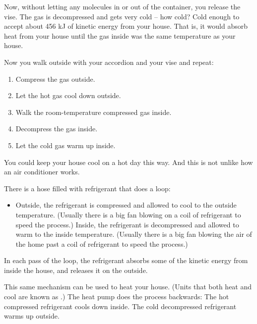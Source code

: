 Now,  without letting any molecules in or out of the container,  you release the vise.  The gas is decompressed and gets very cold -- how cold?  Cold enough to accept about 456 kJ of kinetic energy from your house.  That is,  it would absorb heat from your house until the gas inside was the same temperature as your house.

Now you walk outside with your accordion and your vise and repeat:
\begin{enumerate}
\item Compress the gas outside.
\item Let the hot gas cool down outside.
\item Walk the room-temperature compressed gas inside.
\item Decompress the gas inside.
\item Let the cold gas warm up inside.
\end{enumerate}

You could keep your house cool on a hot day this way.  And this is not unlike how an air conditioner works.

There is a hose filled with refrigerant that does a loop:  
\begin{itemize}
\item Outside,  the refrigerant is compressed and allowed to cool to the outside temperature.  (Usually there is a big fan blowing on a coil of refrigerant to speed the process.)
Inside,  the refrigerant is decompressed and allowed to warm to the inside temperature.  (Usually there is a big fan blowing the air of the home past a coil of refrigerant to speed the process.)
\end{itemize}

In each pass of the loop,  the refrigerant absorbs some of the kinetic energy from inside the house, and releases it on the outside.

This same mechanism can be used to heat your house.  (Units that both heat and cool are known as .)  
The heat pump does the process backwards:  The hot compressed refrigerant cools down inside.  The cold decompressed refrigerant warms up outside.

